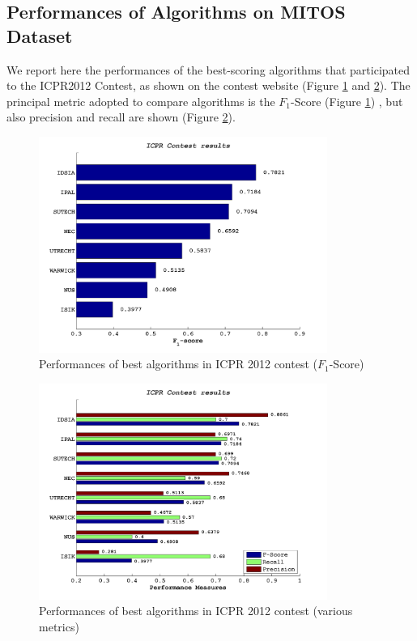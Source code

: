 \vspace{0.5cm}

\subsection{Performances of Algorithms on MITOS Dataset}
\label{ch3:icpr_perf}

We report here the performances of the best-scoring algorithms that participated to the ICPR2012 Contest, as shown on the contest website (Figure \ref{ch3:fig3} and \ref{ch3:fig4}).
The principal metric adopted to compare algorithms is the $F_1$-Score (Figure \ref{ch3:fig3}) , but also precision and recall are shown (Figure \ref{ch3:fig4}). 

\begin{figure}[!htb]
  \centering
      \includegraphics[width=0.84\textwidth]{./images/ICPRperf1.png}
    \caption{Performances of best algorithms in ICPR 2012 contest ($F_1$-Score)}
    \label{ch3:fig3}
\end{figure}

\begin{figure}[t]
  \centering
      \includegraphics[width=0.84\textwidth]{./images/ICPRperf2.png}
    \caption{Performances of best algorithms in ICPR 2012 contest (various metrics)}
    \label{ch3:fig4}
\end{figure}













